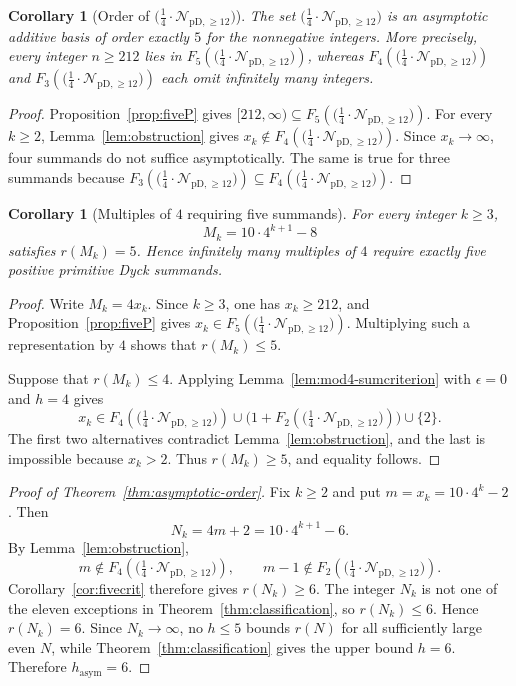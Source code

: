 \documentclass[12pt]{article}
\theoremstyle{plain}
\newtheorem{corollary}[theorem]{Corollary}
\theoremstyle{definition}
\theoremstyle{plain}
\newcommand{\Pset}{%
  \bigl(\tfrac{1}{4}\cdot\mathcal{N}_{\mathrm{pD},\geq 12}\bigr)%
}
\begin{document}
\begin{corollary}[Order of $\Pset$]\label{cor:orderfive}
The set $\Pset$ is an asymptotic additive basis of order exactly $5$ for
the nonnegative integers.  More precisely, every integer $n\geq212$ lies
in $F_5(\Pset)$, whereas $F_4(\Pset)$ and $F_3(\Pset)$ each omit
infinitely many integers.
\end{corollary}

\begin{proof}
Proposition~\ref{prop:fiveP} gives
$[212,\infty)\subseteq F_5(\Pset)$.  For every $k\geq2$,
Lemma~\ref{lem:obstruction} gives $x_k\notin F_4(\Pset)$.  Since
$x_k\to\infty$, four summands do not suffice asymptotically.  The same is
true for three summands because $F_3(\Pset)\subseteq F_4(\Pset)$.
\end{proof}

\begin{corollary}[Multiples of $4$ requiring five summands]
\label{cor:five-multiples}
For every integer $k\geq3$,
\[
 M_k=10\cdot4^{k+1}-8
\]
satisfies $r(M_k)=5$.  Hence infinitely many multiples of $4$ require
exactly five positive primitive Dyck summands.
\end{corollary}

\begin{proof}
Write $M_k=4x_k$.  Since $k\geq3$, one has $x_k\geq212$, and
Proposition~\ref{prop:fiveP} gives $x_k\in F_5(\Pset)$.  Multiplying such
a representation by $4$ shows that $r(M_k)\leq5$.

Suppose that $r(M_k)\leq4$.  Applying
Lemma~\ref{lem:mod4-sumcriterion} with $\epsilon=0$ and $h=4$ gives
\[
 x_k\in
 F_4(\Pset)
 \cup\bigl(1+F_2(\Pset)\bigr)
 \cup\{2\}.
\]
The first two alternatives contradict Lemma~\ref{lem:obstruction}, and
the last is impossible because $x_k>2$.  Thus $r(M_k)\geq5$, and equality
follows.
\end{proof}

\begin{proof}[Proof of Theorem~\ref{thm:asymptotic-order}]
Fix $k\geq2$ and put $m=x_k=10\cdot4^k-2$.  Then
\[
 N_k=4m+2=10\cdot4^{k+1}-6.
\]
By Lemma~\ref{lem:obstruction},
\[
 m\notin F_4(\Pset),
 \qquad
 m-1\notin F_2(\Pset).
\]
Corollary~\ref{cor:fivecrit} therefore gives $r(N_k)\geq6$.  The integer
$N_k$ is not one of the eleven exceptions in
Theorem~\ref{thm:classification}, so $r(N_k)\leq6$.  Hence $r(N_k)=6$.
Since $N_k\to\infty$, no $h\leq5$ bounds $r(N)$ for all sufficiently
large even $N$, while Theorem~\ref{thm:classification} gives the upper
bound $h=6$.  Therefore $h_{\mathrm{asym}}=6$.
\end{proof}
\end{document}
